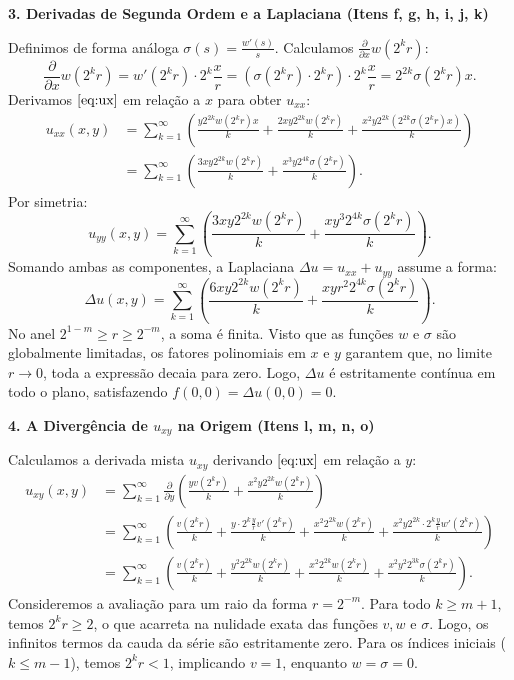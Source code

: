 \documentclass[cs_edp_2026.1.tex]{subfiles} %
\begin{document}
{	\textbf{3. Derivadas de Segunda Ordem e a Laplaciana (Itens f, g, h, i, j, k)}
	
	Definimos de forma análoga $\sigma(s) = \frac{w'(s)}{s}$. Calculamos $\frac{\partial}{\partial x} w(2^k r)$:
	\begin{equation}
		\frac{\partial}{\partial x} w(2^k r) = w'(2^k r) \cdot 2^k \frac{x}{r} = (\sigma(2^k r) \cdot 2^k r) \cdot 2^k \frac{x}{r} = 2^{2k} \sigma(2^k r) x.
	\end{equation}
	Derivamos $\eqref{eq:ux}$ em relação a $x$ para obter $u_{xx}$:
	\begin{align}
		u_{xx}(x,y) &= \sum_{k=1}^\infty \left( \frac{y 2^{2k} w(2^k r) x}{k} + \frac{2xy 2^{2k} w(2^k r)}{k} + \frac{x^2 y 2^{2k} (2^{2k} \sigma(2^k r) x)}{k} \right) \nonumber \\
		&= \sum_{k=1}^\infty \left( \frac{3xy 2^{2k} w(2^k r)}{k} + \frac{x^3 y 2^{4k} \sigma(2^k r)}{k} \right). \label{eq:uxx}
	\end{align}
	Por simetria:
	\begin{equation}
		u_{yy}(x,y) = \sum_{k=1}^\infty \left( \frac{3xy 2^{2k} w(2^k r)}{k} + \frac{x y^3 2^{4k} \sigma(2^k r)}{k} \right). \label{eq:uyy}
	\end{equation}
	Somando ambas as componentes, a Laplaciana $\Delta u = u_{xx} + u_{yy}$ assume a forma:
	\begin{equation}
		\Delta u(x,y) = \sum_{k=1}^\infty \left( \frac{6xy 2^{2k} w(2^k r)}{k} + \frac{xy r^2 2^{4k} \sigma(2^k r)}{k} \right).
	\end{equation}
	No anel $2^{1-m} \ge r \ge 2^{-m}$, a soma é finita. Visto que as funções $w$ e $\sigma$ são globalmente limitadas, os fatores polinomiais em $x$ e $y$ garantem que, no limite $r \to 0$, toda a expressão decaia para zero. Logo, $\Delta u$ é estritamente contínua em todo o plano, satisfazendo $f(0,0) = \Delta u(0,0) = 0$.
	
	\textbf{4. A Divergência de $u_{xy}$ na Origem (Itens l, m, n, o)}
	
	Calculamos a derivada mista $u_{xy}$ derivando $\eqref{eq:ux}$ em relação a $y$:
	\begin{align}
		u_{xy}(x,y) &= \sum_{k=1}^\infty \frac{\partial}{\partial y} \left( \frac{y v(2^k r)}{k} + \frac{x^2 y 2^{2k} w(2^k r)}{k} \right) \nonumber \\
		&= \sum_{k=1}^\infty \left( \frac{v(2^k r)}{k} + \frac{y \cdot 2^k \frac{y}{r} v'(2^k r)}{k} + \frac{x^2 2^{2k} w(2^k r)}{k} + \frac{x^2 y 2^{2k} \cdot 2^k \frac{y}{r} w'(2^k r)}{k} \right) \nonumber \\
		&= \sum_{k=1}^\infty \left( \frac{v(2^k r)}{k} + \frac{y^2 2^{2k} w(2^k r)}{k} + \frac{x^2 2^{2k} w(2^k r)}{k} + \frac{x^2 y^2 2^{3k} \sigma(2^k r)}{k} \right).
	\end{align}
	Consideremos a avaliação para um raio da forma $r = 2^{-m}$.
	Para todo $k \ge m+1$, temos $2^k r \ge 2$, o que acarreta na nulidade exata das funções $v, w$ e $\sigma$. Logo, os infinitos termos da cauda da série são estritamente zero. Para os índices iniciais ($k \le m-1$), temos $2^k r < 1$, implicando $v = 1$, enquanto $w = \sigma = 0$.
	
}
\end{document}
